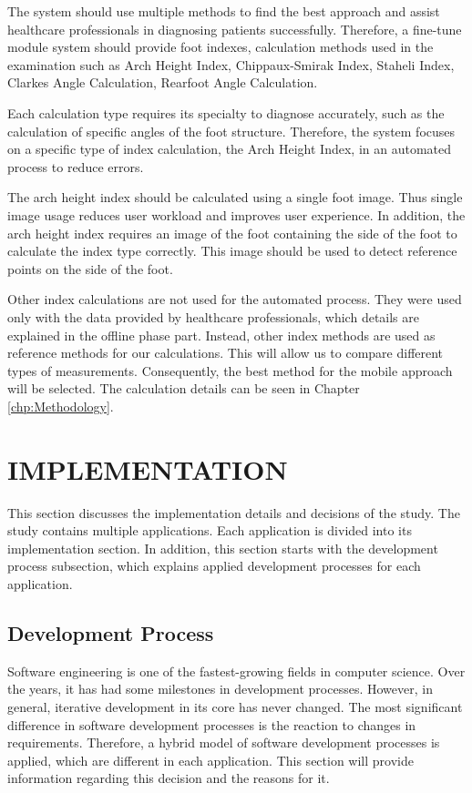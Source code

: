 The system should use multiple methods to find the best approach and assist healthcare professionals in diagnosing patients successfully. Therefore, a fine-tune module system should provide foot indexes, calculation methods used in the examination such as Arch Height Index, Chippaux-Smirak Index, Staheli Index, Clarkes Angle Calculation, Rearfoot Angle Calculation. 

Each calculation type requires its specialty to diagnose accurately, such as the calculation of specific angles of the foot structure. Therefore, the system focuses on a specific type of index calculation, the Arch Height Index, in an automated process to reduce errors.

The arch height index should be calculated using a single foot image. Thus single image usage reduces user workload and improves user experience. In addition, the arch height index requires an image of the foot containing the side of the foot to calculate the index type correctly. This image should be used to detect reference points on the side of the foot. 

Other index calculations are not used for the automated process. They were used only with the data provided by healthcare professionals, which details are explained in the offline phase part. Instead, other index methods are used as reference methods for our calculations. This will allow us to compare different types of measurements. Consequently, the best method for the mobile approach will be selected. The calculation details can be seen in Chapter \ref{chp:Methodology}.

\section{IMPLEMENTATION}\label{sec:StudyIImplementation}

This section discusses the implementation details and decisions of the study. The study contains multiple applications. Each application is divided into its implementation section. In addition, this section starts with the development process subsection, which explains applied development processes for each application.

\subsection{Development Process}

Software engineering is one of the fastest-growing fields in computer science. Over the years, it has had some milestones in development processes. However, in general, iterative development in its core has never changed. The most significant difference in software development processes is the reaction to changes in requirements. Therefore,  a hybrid model of software development processes is applied, which are different in each application. This section will provide information regarding this decision and the reasons for it.

